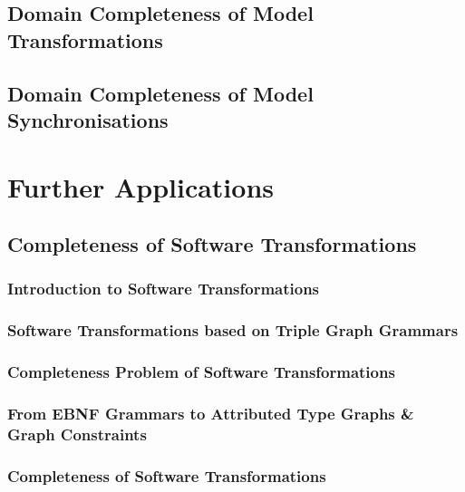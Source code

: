 \documentclass{eceasst}
\begin{document}
\section{Domain Completeness of Model Transformations}
\label{sec-dom-compl-mt}


\section{Domain Completeness of Model Synchronisations}
\label{sec-dom-compl-synch}


\chapter{Further Applications}
\label{sec-further-appl}

\section{Completeness of Software Transformations}
\label{sec-compl-software-trans}

\subsection{Introduction to Software Transformations}


\subsection{Software Transformations based on Triple Graph Grammars}
\label{sec-compl-software-trans-tgg}


\subsection{Completeness Problem of Software Transformations}
\label{sec-compl-software-trans-prob}


\subsection{From EBNF Grammars to Attributed Type Graphs \& Graph Constraints}
\label{sec-compl-software-trans-mapping}


\subsection{Completeness of Software Transformations}
\label{sec-compl-software-trans-completeness}

\end{document}
